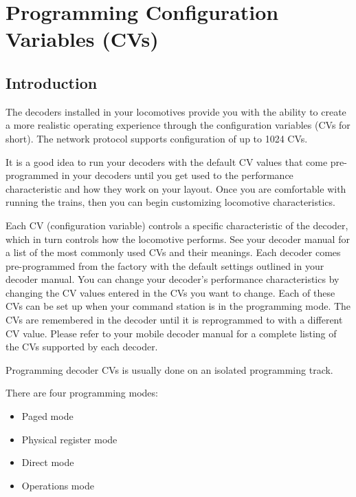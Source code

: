  

\chapter[Configuration Variables]{Programming Configuration Variables (CVs)}

\section{Introduction}

The decoders installed in your locomotives provide you with the ability to create a more realistic operating experience through the configuration variables (CVs for short). The network protocol supports configuration of up to
1024 CVs.

It is a good idea to run your decoders with the default CV values that come pre-programmed in your decoders until you get used to the performance characteristic and how they work on your layout. Once you are comfortable with running the trains, then you can begin customizing locomotive characteristics.

Each CV (configuration variable) controls a specific characteristic of the decoder, which in turn controls how the locomotive performs. See your decoder manual for a list of the most commonly used CVs and their meanings.
Each decoder comes pre-programmed from the factory with the default settings outlined in your decoder manual. You can change your decoder’s performance characteristics by changing the CV values entered in the CVs you want to change. Each of these CVs can be set up when your command station is in the programming mode. The CVs are remembered in the decoder until it is reprogrammed to with a different CV value. Please refer to your mobile decoder manual for a complete listing of the CVs supported by each decoder.

Programming decoder CVs is usually done on an isolated programming track.

There are four programming modes:

\begin{itemize}
\item Paged mode
\item Physical register mode
\item Direct mode
\item Operations mode
\end{itemize}

